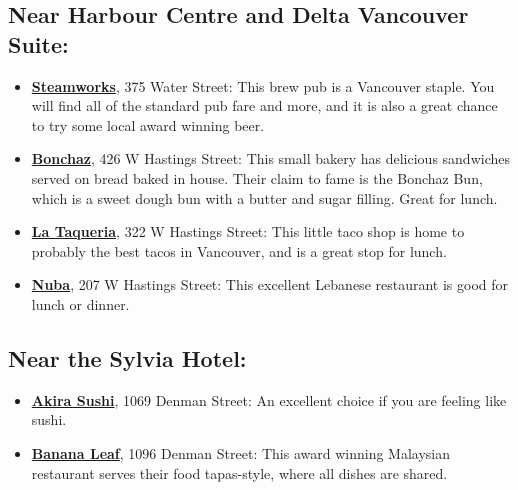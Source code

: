 \documentclass[letterpaper,12pt]{article}
\begin{document}
\subsection*{Near Harbour Centre and Delta Vancouver Suite:}
\begin{itemize}
\setlength{\itemsep}{0pt}
\item \href{http://www.steamworks.com}{\textbf{Steamworks}}, 375 Water Street: This brew pub is a Vancouver staple. You will find all of the standard pub fare and more, and it is also a great chance to try some local award winning beer.
\item \href{http://www.bonchaz.ca}{\textbf{Bonchaz}}, 426 W Hastings Street: This small bakery has delicious sandwiches served on bread baked in house. Their claim to fame is the Bonchaz Bun, which is a sweet dough bun with a butter and sugar filling. Great for lunch.
\item \href{http://www.lataqueria.com}{\textbf{La Taqueria}}, 322 W Hastings Street: This little taco shop is home to probably the best tacos in Vancouver, and is a great stop for lunch.
\item \href{http://www.nuba.ca}{\textbf{Nuba}}, 207 W Hastings Street: This excellent Lebanese restaurant is good for lunch or dinner.
\end{itemize}

\subsection*{Near the Sylvia Hotel:}
\begin{itemize}
\setlength{\itemsep}{0pt}
\item \href{http://www.akirasushi.ca}{\textbf{Akira Sushi}}, 1069 Denman Street: An excellent choice if you are feeling like sushi.
\item \href{http://www.bananaleaf-vancouver.com}{\textbf{Banana Leaf}}, 1096 Denman Street: This award winning Malaysian restaurant serves their food tapas-style, where all dishes are shared.
\end{itemize}
\end{document}
